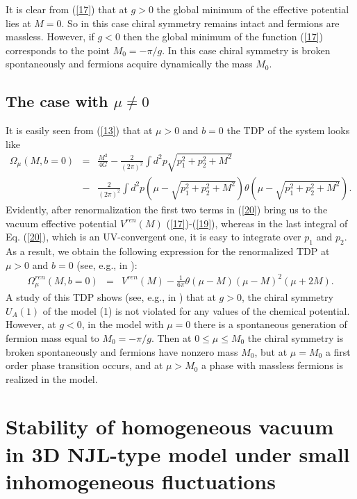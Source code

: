 \documentclass[12pt,a4paper]{article}
\begin{document}
It is clear from (\ref{17}) that at $g>0$ the global minimum of the
effective potential lies at $M=0$. So in this case chiral symmetry
remains intact and fermions are massless. However, if $g<0$ then the
global minimum of the function (\ref{17}) corresponds to the point
$M_0=-\pi/g$. In this case chiral symmetry is broken spontaneously
and fermions acquire dynamically the mass $M_0$.


\subsection{The case with $\mu\ne 0$}

It is easily seen from (\ref{13}) that at $\mu>0$ and $b=0$ the TDP of  the system looks like
\begin{eqnarray}
\Omega_\mu (M,b=0)&
=&\frac{M^2}{4G}-\frac{2}{(2\pi)^2}\int d^2p\sqrt{p_1^2+p_2^2+M^2}\nonumber\\
&-&\frac{2}{(2\pi)^2}\int d^2p\left
(\mu-\sqrt{p_1^2+p_2^2+M^2}\right ) \theta\left
(\mu-\sqrt{p_1^2+p_2^2+M^2}\right ). \label{20}
\end{eqnarray}
Evidently, after renormalization the first two terms in (\ref{20}) bring us to the
vacuum effective potential $V^{ren}(M)$ (\ref{17})-(\ref{19}), whereas in the
last integral of Eq. (\ref{20}), which is an UV-convergent one, it is easy
to integrate over $p_1$ and $p_2$. As a result, we obtain the following expression for the renormalized
TDP at $\mu>0$ and $b=0$ (see, e.g.,  in \cite{klimenko}):
\begin{eqnarray}
\Omega^{ren}_\mu (M,b=0)&=&V^{ren}(M)-\frac{1}{6\pi}
\theta (\mu-M)(\mu-M)^2(\mu+2M).
\label{21}\end{eqnarray}
A study of this TDP shows (see, e.g., in \cite{klimenko}) that at $g>0$, the chiral symmetry
$U_A(1)$ of the model (1) is not violated for any values of the chemical potential. However, at
$g<0$, in the model with $\mu=0$ there is a spontaneous generation of fermion
mass equal to $M_0=-\pi /g$. Then at $0\le\mu\le M_0$ the chiral symmetry is broken
spontaneously and fermions have nonzero mass $M_0$, but at $\mu=M_0$ a first order phase
transition occurs, and at $\mu >M_0$ a phase with massless fermions is realized in the model.



\section{Stability of homogeneous vacuum in 3D NJL-type model under small inhomogeneous
fluctuations}
\end{document}
